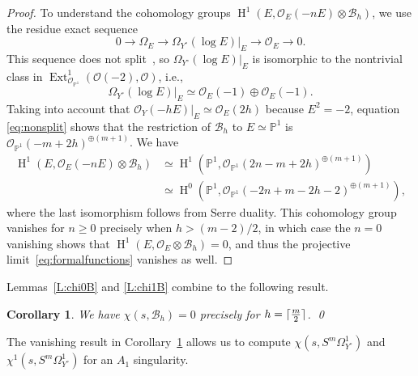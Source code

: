 \documentclass[12pt, reqno]{amsart}
\DeclarePairedDelimiter{\ceil}{\lceil}{\rceil}
\newtheorem{cor}[lemma]{Corollary}
\theoremstyle{definition}
\newcommand{\PP}{{\mathbb P}}
\newcommand{\calB}{{\mathcal B}}
\newcommand{\calO}{{\mathcal O}}
\DeclareMathOperator{\HH}{H}
\DeclareMathOperator{\Ext}{Ext}
\numberwithin{equation}{section}
\numberwithin{table}{section}
\begin{document}
\begin{proof}
To understand the cohomology groups $\HH^1(E,\calO_E(-nE)\otimes\calB_h)$, we use the residue exact sequence
\[
0 \to \Omega_E  \to \Omega_{Y^\circ}(\log E)|_E \to \calO_E \to 0.
\]
This sequence does not split~\cite[3.3]{Wahl1976}, so $\Omega_{Y^\circ}(\log E)|_E$ is isomorphic to the nontrivial class in $\Ext^1_{\calO_{\PP^1}}(\calO(-2),\calO)$, i.e.,
\begin{equation}
\label{eq:nonsplit}
\Omega_{Y^\circ}(\log E)|_E \simeq \calO_E(-1)\oplus \calO_E(-1).
\end{equation}
Taking into account that $\calO_Y(-hE)|_E \simeq \calO_E(2h)$ because $E^2 = -2$, equation \eqref{eq:nonsplit} shows that the restriction of $\calB_h$ to $E \simeq \PP^1$ is $\calO_{\PP^1}(-m+2h)^{\oplus(m+1)}$. We have
\begin{align*}
\HH^1(E,\calO_E(-nE)\otimes\calB_h) &\simeq \HH^1(\PP^1,\calO_{\PP^1}({2n}-m+2h)^{\oplus(m+1)}) \\
&\simeq \HH^0(\PP^1,\calO_{\PP^1}({-2n}+m-2h-2)^{\oplus(m+1)}),
\end{align*}
where the last isomorphism follows from Serre duality. This cohomology group vanishes for $n\geq 0$ precisely when $h > (m-2)/2$, in which case the $n=0$ vanishing shows that $\HH^1(E,\calO_{E}\otimes \calB_h) = 0$, and thus the projective limit~\eqref{eq:formalfunctions} vanishes as well.
\end{proof}

Lemmas~\ref{L:chi0B} and \ref{L:chi1B} combine to the following result.
\begin{cor}\label{C:chiB} We have $\chi(s,\calB_h)=0$ precisely for $h=\ceil{\frac{m}{2}}$.
\hfill\qed
\end{cor}

The vanishing result in Corollary~\ref{C:chiB} allows us to compute $\chi(s,S^m\Omega^1_{Y^\circ})$ and $\chi^1(s,S^m\Omega^1_{Y^\circ})$ for an $A_1$ singularity.
\end{document}
